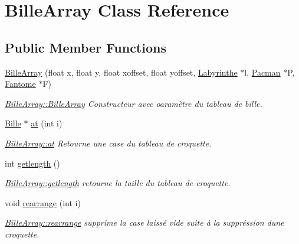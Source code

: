 \hypertarget{class_bille_array}{}\section{Bille\+Array Class Reference}
\label{class_bille_array}
\subsection*{Public Member Functions}
\begin{DoxyCompactItemize}
\item 
\hyperlink{class_bille_array_a068f32eb349279de9229438856b725e5}{Bille\+Array} (float x, float y, float xoffset, float yoffset, \hyperlink{class_labyrinthe}{Labyrinthe} $\ast$l, \hyperlink{class_pacman}{Pacman} $\ast$P, \hyperlink{class_fantome}{Fantome} $\ast$F)
\begin{DoxyCompactList}\small\item\em \hyperlink{class_bille_array_a068f32eb349279de9229438856b725e5}{Bille\+Array\+::\+Bille\+Array} Constructeur avec oaramètre du tableau de bille. \end{DoxyCompactList}\item 
\hyperlink{class_bille}{Bille} $\ast$ \hyperlink{class_bille_array_abaee48e0bed559510be12698e5bc462e}{at} (int i)
\begin{DoxyCompactList}\small\item\em \hyperlink{class_bille_array_abaee48e0bed559510be12698e5bc462e}{Bille\+Array\+::at} Retourne une case du tableau de croquette. \end{DoxyCompactList}\item 
int \hyperlink{class_bille_array_a125610f2f906d8810c3a1266e1976617}{getlength} ()
\begin{DoxyCompactList}\small\item\em \hyperlink{class_bille_array_a125610f2f906d8810c3a1266e1976617}{Bille\+Array\+::getlength} retourne la taille du tableau de croquette. \end{DoxyCompactList}\item 
void \hyperlink{class_bille_array_a49fa7a7d7ad867c838205b490488c7a3}{rearrange} (int i)
\begin{DoxyCompactList}\small\item\em \hyperlink{class_bille_array_a49fa7a7d7ad867c838205b490488c7a3}{Bille\+Array\+::rearrange} supprime la case laissé vide suite à la suppréssion d\textquotesingle{}une croquette. \end{DoxyCompactList}\end{DoxyCompactItemize}


